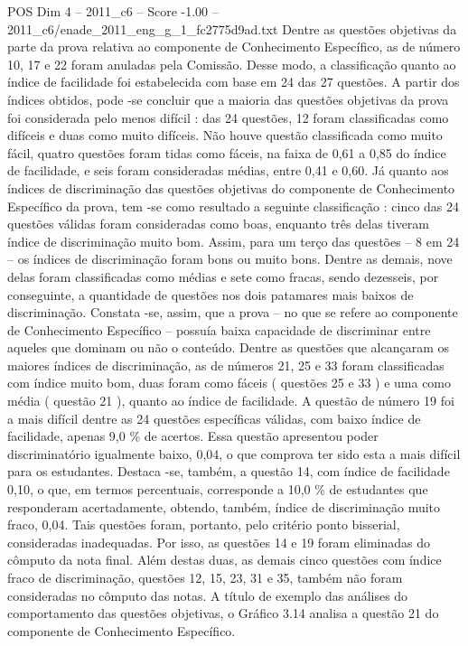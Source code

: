 \begin{textsample}{POS Dim 4 – 2011\_c6 – Score -1.00 – 2011\_c6/enade\_2011\_eng\_g\_1\_fc2775d9ad.txt}
Dentre as questões objetivas da parte da prova relativa ao componente de Conhecimento Específico, as de número 10, 17 e 22 foram anuladas pela Comissão.
Desse modo, a classificação quanto ao índice de facilidade foi estabelecida com base em 24 das 27 questões.
A partir dos índices obtidos, pode -se concluir que a maioria das questões objetivas da prova foi considerada pelo menos difícil : das 24 questões, 12 foram classificadas como difíceis e duas como muito difíceis.
Não houve questão classificada como muito fácil, quatro questões foram tidas como fáceis, na faixa de 0,61 a 0,85 do índice de facilidade, e seis foram consideradas médias, entre 0,41 e 0,60.
Já quanto aos índices de discriminação das questões objetivas do componente de Conhecimento Específico da prova, tem -se como resultado a seguinte classificação : cinco das 24 questões válidas foram consideradas como boas, enquanto três delas tiveram índice de discriminação muito bom.
Assim, para um terço das questões – 8 em 24 – os índices de discriminação foram bons ou muito bons.
Dentre as demais, nove delas foram classificadas como médias e sete como fracas, sendo dezesseis, por conseguinte, a quantidade de questões nos dois patamares mais baixos de discriminação.
Constata -se, assim, que a prova – no que se refere ao componente de Conhecimento Específico – possuía baixa capacidade de discriminar entre aqueles que dominam ou não o conteúdo.
Dentre as questões que alcançaram os maiores índices de discriminação, as de números 21, 25 e 33 foram classificadas com índice muito bom, duas foram como fáceis ( questões 25 e 33 ) e uma como média ( questão 21 ), quanto ao índice de facilidade.
A questão de número 19 foi a mais difícil dentre as 24 questões específicas válidas, com baixo índice de facilidade, apenas 9,0 \% de acertos.
Essa questão apresentou poder discriminatório igualmente baixo, 0,04, o que comprova ter sido esta a mais difícil para os estudantes.
Destaca -se, também, a questão 14, com índice de facilidade 0,10, o que, em termos percentuais, corresponde a 10,0 \% de estudantes que responderam acertadamente, obtendo, também, índice de discriminação muito fraco, 0,04.
Tais questões foram, portanto, pelo critério ponto bisserial, consideradas inadequadas.
Por isso, as questões 14 e 19 foram eliminadas do cômputo da nota final.
Além destas duas, as demais cinco questões com índice fraco de discriminação, questões 12, 15, 23, 31 e 35, também não foram consideradas no cômputo das notas.
A título de exemplo das análises do comportamento das questões objetivas, o Gráfico 3.14 analisa a questão 21 do componente de Conhecimento Específico.

\end{textsample}
